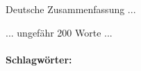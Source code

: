 \vspace{0.5cm}

Deutsche Zusammenfassung ...

... ungefähr 200 Worte ...

\tocless\paragraph{Schlagwörter:}
